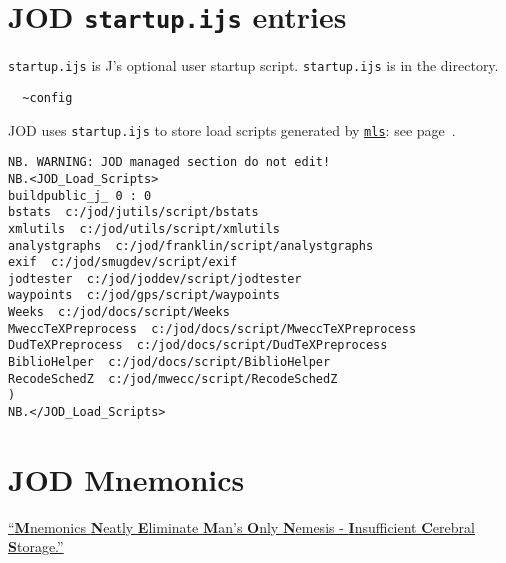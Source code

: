    
   \newpage
   \section{JOD \texttt{startup.ijs} entries}\label{ap:startup}
   
\verb|startup.ijs| is J's optional user startup 
script. \verb|startup.ijs| is in the directory.
\begin{verbatim}
  ~config   
\end{verbatim}
JOD uses \verb|startup.ijs|
to store load scripts generated by \hyperlink{il:mls}{\texttt{mls}}: see page~\pageref{ss:mls}.
   
\begin{lstlisting}[frame=single,framerule=0pt,basicstyle=\ttfamily\footnotesize]   
NB. WARNING: JOD managed section do not edit!
NB.<JOD_Load_Scripts>
buildpublic_j_ 0 : 0
bstats  c:/jod/jutils/script/bstats
xmlutils  c:/jod/utils/script/xmlutils
analystgraphs  c:/jod/franklin/script/analystgraphs
exif  c:/jod/smugdev/script/exif
jodtester  c:/jod/joddev/script/jodtester
waypoints  c:/jod/gps/script/waypoints
Weeks  c:/jod/docs/script/Weeks
MweccTeXPreprocess  c:/jod/docs/script/MweccTeXPreprocess
DudTeXPreprocess  c:/jod/docs/script/DudTeXPreprocess
BiblioHelper  c:/jod/docs/script/BiblioHelper
RecodeSchedZ  c:/jod/mwecc/script/RecodeSchedZ
)
NB.</JOD_Load_Scripts>
\end{lstlisting}

\newpage

  
\newpage


\newpage
\section{JOD Mnemonics}

\large
\itshape
  
\href{http://www.acronymfinder.com/Mnemonics-Neatly-Eliminate-Man's-Only-Nemesis-_-Insufficient-Cerebral-Storage-(MNEMONICS).html}{``\textbf{M}nemonics \textbf{N}eatly \textbf{E}liminate \textbf{M}an's \textbf{O}nly \textbf{N}emesis - \textbf{I}nsufficient \textbf{C}erebral \textbf{S}torage.''}

\Large

